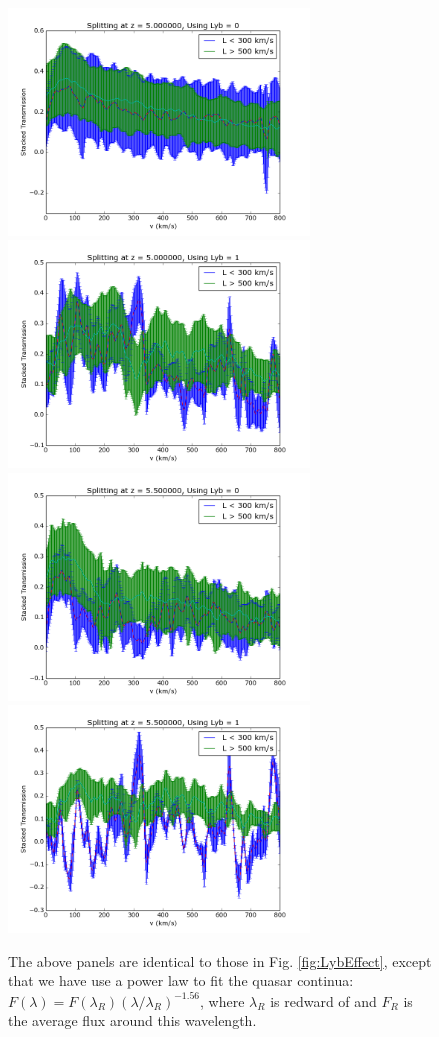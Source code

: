 \documentclass[11pt]{article}
\begin{document}
\begin{figure}[h]
  \centering
  \includegraphics[width=8cm]{LyaStack_wErrors_500kms_z5_PLfit.png}
  \includegraphics[width=8cm]{LybStack_wErrors_500kms_z5_PLfit.png}
  \includegraphics[width=8cm]{LyaStack_wErrors_500kms_z5p5_PLfit.png}
  \includegraphics[width=8cm]{LybStack_wErrors_500kms_z5p5_PLfit.png}
  \caption{The above panels are identical to those in Fig. \ref{fig:LybEffect}, except that we have use a power law to fit the quasar continua: $F(\lambda) = F(\lambda_{R})\left(\lambda/\lambda_{R}\right)^{-1.56}$, where $\lambda_{R}$ is redward of \lya and $F_{R}$ is the average flux around this wavelength.}
  \label{fig:todo}
\end{figure}
\end{document}
